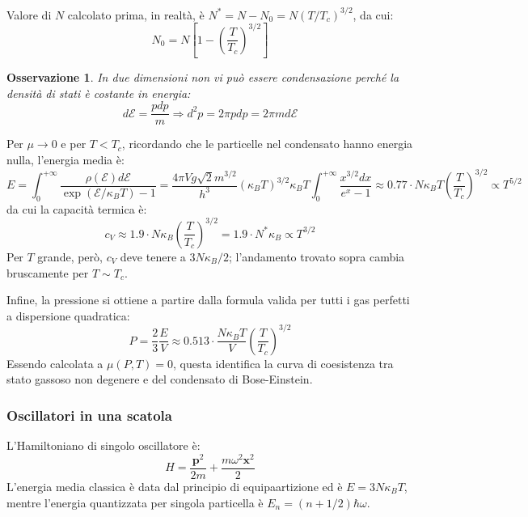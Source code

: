 \documentclass[10pt, a4paper]{scrartcl}
\numberwithin{equation}{subsection}
\theoremstyle{style1}
\newtheorem{osservazione}{Osservazione}[section]
\begin{document}
Valore di $N$ calcolato prima, in realt\`a, \`e $N^* = N - N_0 = N (T / T_c)^{3 / 2} $, da cui:
\begin{equation}
	N_0 = N \left[1 - \left(\frac{T}{T_c}\right) ^{3 / 2} \right] 
\end{equation}
\begin{osservazione}
	In due dimensioni non vi pu\`o essere condensazione perch\'e la densit\`a di stati \`e costante in energia:
	\[
	d \mathscr{E} = \frac{p dp }{m} \Rightarrow d^2 p = 2 \pi p dp = 2\pi m d\mathscr{E}
	\] 
\end{osservazione}
\noindent Per $\mu \to 0$ e per $T< T_c$, ricordando che le particelle nel condensato hanno energia nulla, l'energia media \`e:
\begin{equation}
		E = \int_{0} ^{+\infty}\frac{\rho  ( \mathscr{E}) d \mathscr{E}}{\exp(\mathscr{E} / \kappa _B T) - 1} = \frac{4\pi V g \sqrt{2} m^{3 / 2} }{h^3} (\kappa _BT)^{ 3 / 2} \kappa _B T \int_{0} ^{+\infty} \frac{x ^{3 / 2} dx}{e^x - 1}\approx 0.77 \cdot N\kappa _B T \left(\frac{T}{T_c}\right) ^{3 / 2} \propto T^{5 / 2} 
\end{equation}
da cui la capacit\`a termica \`e:
\begin{equation}
	c_V \approx 1.9 \cdot  N\kappa _B \left(\frac{T}{T_c}\right) ^{3 / 2} = 1.9 \cdot  N^* \kappa _B \propto T^{3 / 2} 
\end{equation}
Per $T$ grande, per\`o, $c_V $ deve tenere a $3N\kappa _B / 2$; l'andamento trovato sopra cambia bruscamente per $T \sim T_c$.

Infine, la pressione si ottiene a partire dalla formula valida per tutti i gas perfetti a dispersione quadratica:
\begin{equation}
	P = \frac{2}{3} \frac{E}{V} \approx 0.513 \cdot  \frac{N\kappa _B T}{V} \left(\frac{T}{T_c}\right) ^{3/2} 
\end{equation}
Essendo calcolata a $\mu (P,T) = 0$, questa identifica la curva di coesistenza tra stato gassoso non degenere e del condensato di Bose-Einstein.

\subsubsection{Oscillatori in una scatola}

L'Hamiltoniano di singolo oscillatore \`e:
\begin{equation}
	H = \frac{\mathbf{p} ^2}{2m} + \frac{m\omega ^2 \mathbf{x} ^2}{2}		
\end{equation}
L'energia media classica \`e data dal principio di equipaartizione ed \`e $E = 3N\kappa _B T$, mentre l'energia quantizzata per singola particella \`e $E_n=(n+1 / 2) \hbar \omega$.
\end{document}
